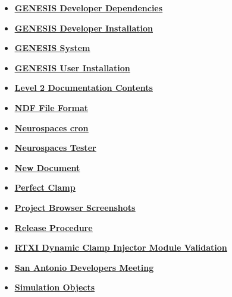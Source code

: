 \documentclass[12pt]{article}
\begin{document}
\begin{itemize}
\item \href{../genesis-dependencies/genesis-dependencies.pdf}{\bf \underline{GENESIS Developer Dependencies}}

\item \href{../installation-developer/installation-developer.pdf}{\bf \underline{GENESIS Developer Installation}}

\item \href{../genesis-system/genesis-system.pdf}{\bf \underline{GENESIS System}}

\item \href{../installation-user/installation-user.pdf}{\bf \underline{GENESIS User Installation}}

\item \href{../contents-level2/contents-level2.pdf}{\bf \underline{Level 2 Documentation Contents}}

\item \href{../ndf-file-format/ndf-file-format.pdf}{\bf \underline{NDF File Format}}

\item \href{../neurospaces-cron/neurospaces-cron.pdf}{\bf \underline{Neurospaces cron}}

\item \href{../neurospaces-tester/neurospaces-tester.pdf}{\bf \underline{Neurospaces Tester}}

\item \href{../NewDocument/NewDocument.pdf}{\bf \underline{New Document}}

\item \href{../pclamp/pclamp.pdf}{\bf \underline{Perfect Clamp}}

\item \href{../project-browser-screenshots/project-browser-screenshots.pdf}{\bf \underline{Project Browser Screenshots}}

\item \href{../release-procedure/release-procedure.pdf}{\bf \underline{Release Procedure}}

\item \href{../rtxi-injector-validation/rtxi-injector-validation.pdf}{\bf \underline{RTXI Dynamic Clamp Injector Module Validation}}

\item \href{../san-antonio-1/san-antonio-1.pdf}{\bf \underline{San Antonio Developers Meeting}}

\item \href{../simulation-objects/simulation-objects.pdf}{\bf \underline{Simulation Objects}}


\end{itemize}
\end{document}
